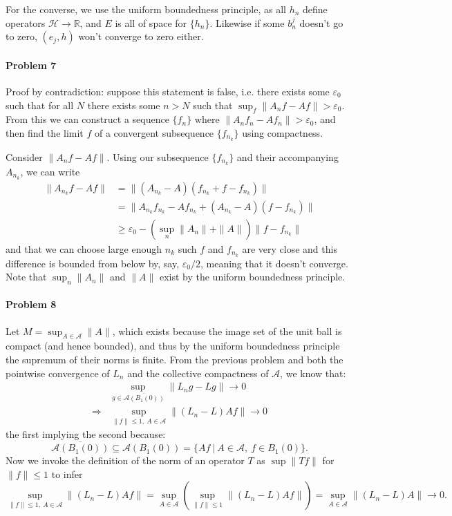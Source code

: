 \documentclass[12pt]{article}
\begin{document}
For the converse, we use the uniform boundedness principle, as all $h_n$ define
operators $\mathcal{H}\to \mathbb{R}$, and $E$ is all of space for $\{h_n\}$.
Likewise if some $b^j_n$ doesn't go to zero, $(e_j,h)$ won't converge to zero
either.

\paragraph{Problem 7}

Proof by contradiction: suppose this statement is false, i.e. there exists
some $\varepsilon_0$ such that for all $N$ there exists some $n>N$ such that
$\sup_f\|A_nf-Af\| > \varepsilon_0$. From this we can construct a sequence
$\{f_n\}$ where $\|A_nf_n - Af_n\|> \varepsilon_0$, and then find the limit
$f$ of a convergent subsequence $\{f_{n_k}\}$ using compactness.

Consider $\|A_nf-Af\|$. Using our subsequence $\{f_{n_k}\}$ and their
accompanying $A_{n_k}$, we can write
\begin{align*}
  \|A_{n_k}f - Af\|
  &= \|(A_{n_k}-A)(f_{n_k} + f - f_{n_k})\|\\
  &= \|A_{n_k}f_{n_k}-Af_{n_k} + (A_{n_k}-A)(f-f_{n_k})\|\\
  &\geq \varepsilon_0 - (\sup_n\|A_{n}\|+\|A\|)\|f-f_{n_k}\|
\end{align*}
and that we can choose large enough $n_k$ such $f$ and $f_{n_k}$ are very close
and this difference is bounded from
below by, say, $\varepsilon_0/2$, meaning that it doesn't converge. Note that
$\sup_n\|A_n\|$ and $\|A\|$ exist by the uniform boundedness principle.

\paragraph{Problem 8}

Let $M = \sup_{A \in \mathcal{A}}\|A\|$, which exists because the image set of the
unit ball is compact (and hence bounded), and thus by the uniform boundedness
principle the supremum of their norms is finite. From the previous problem and
both the pointwise convergence of $L_n$ and the collective compactness of
$\mathcal{A}$, we know that:
\begin{align*}
  & \sup_{g\in \overline{\mathcal{A}(B_1(0))}}\|L_ng-Lg\| \to 0\\
  \Rightarrow &\sup_{\|f\| \leq 1,\ A\in \mathcal{A}}\|(L_n-L)Af\| \to 0
\end{align*}
the first implying the second because:
\begin{displaymath}
  \overline{\mathcal{A}(B_1(0))} \subseteq \mathcal{A}(B_1(0)) =
  \{Af\ |\ A\in \mathcal{A},\ f\in B_1(0)\}.
\end{displaymath}
Now we invoke the definition of the norm of an operator $T$ as $\sup\|Tf\|$
for $\|f\|\leq 1$ to infer
\begin{displaymath}
  \sup_{\|f\|\leq 1,\ A\in \mathcal{A}}\|(L_n-L)Af\| = \sup_{A\in\mathcal{A}}
  (\sup_{\|f\|\leq 1}\|(L_n-L)Af\|) = \sup_{A\in\mathcal{A}}\|(L_n-L)A\|\to 0.
\end{displaymath}
\end{document}

